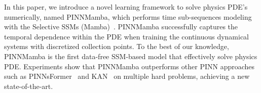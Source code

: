 


In this paper, we introduce a novel learning framework to solve physics PDE's numerically, named PINNMamba, which performs time sub-sequences modeling with the Selective SSMs (Mamba)~\cite{gu2023mamba}. PINNMamba successfully captures the temporal dependence within the PDE when training the continuous dynamical systems with discretized collection points.
To the best of our knowledge, PINNMamba is the first data-free SSM-based model that effectively solve physics PDE.
Experiments show that PINNMamba outperforms other PINN approaches
such as PINNsFormer~\cite{zhao2024pinnsformer} and KAN~\cite{liu2024kan} on multiple hard problems, achieving a new state-of-the-art.

